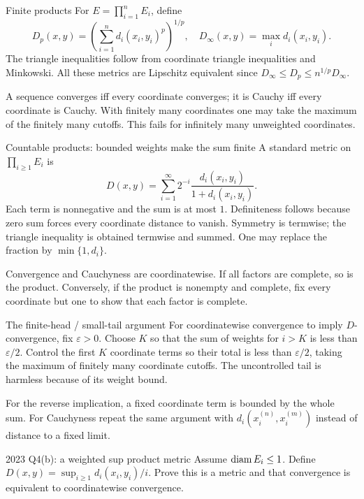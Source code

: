 \begin{note}{Finite products}
For $E=\prod_{i=1}^nE_i$, define
\[D_p(x,y)=\left(\sum_{i=1}^nd_i(x_i,y_i)^p\right)^{1/p},\quad D_\infty(x,y)=\max_i d_i(x_i,y_i).\]
The triangle inequalities follow from coordinate triangle inequalities and Minkowski. All these metrics are Lipschitz equivalent since $D_\infty\le D_p\le n^{1/p}D_\infty$.

A sequence converges iff every coordinate converges; it is Cauchy iff every coordinate is Cauchy. With finitely many coordinates one may take the maximum of the finitely many cutoffs. This fails for infinitely many unweighted coordinates.
\end{note}
\begin{note}{Countable products: bounded weights make the sum finite}
A standard metric on $\prod_{i\ge1}E_i$ is
\[D(x,y)=\sum_{i=1}^{\infty}2^{-i}\frac{d_i(x_i,y_i)}{1+d_i(x_i,y_i)}.\]
Each term is nonnegative and the sum is at most $1$. Definiteness follows because zero sum forces every coordinate distance to vanish. Symmetry is termwise; the triangle inequality is obtained termwise and summed. One may replace the fraction by $\min\{1,d_i\}$.

Convergence and Cauchyness are coordinatewise. If all factors are complete, so is the product. Conversely, if the product is nonempty and complete, fix every coordinate but one to show that each factor is complete.
\end{note}
\begin{method}{The finite-head / small-tail argument}
For coordinatewise convergence to imply $D$-convergence, fix $\varepsilon>0$. Choose $K$ so that the sum of weights for $i>K$ is less than $\varepsilon/2$. Control the first $K$ coordinate terms so their total is less than $\varepsilon/2$, taking the maximum of finitely many coordinate cutoffs. The uncontrolled tail is harmless because of its weight bound.

For the reverse implication, a fixed coordinate term is bounded by the whole sum. For Cauchyness repeat the same argument with $d_i(x_i^{(n)},x_i^{(m)})$ instead of distance to a fixed limit.
\end{method}
\begin{exam}{2023 Q4(b): a weighted sup product metric}
Assume $\operatorname{diam} E_i\le1$. Define $D(x,y)=\sup_{i\ge1}d_i(x_i,y_i)/i$. Prove this is a metric and that convergence is equivalent to coordinatewise convergence.
\end{exam}
